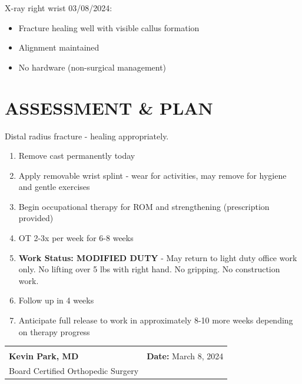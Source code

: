 \documentclass[11pt]{article}
\begin{document}
X-ray right wrist 03/08/2024:
\begin{itemize}[nosep]
\item Fracture healing well with visible callus formation
\item Alignment maintained
\item No hardware (non-surgical management)
\end{itemize}

\section*{ASSESSMENT \& PLAN}

Distal radius fracture - healing appropriately.

\begin{enumerate}
\item Remove cast permanently today
\item Apply removable wrist splint - wear for activities, may remove for hygiene and gentle exercises
\item Begin occupational therapy for ROM and strengthening (prescription provided)
\item OT 2-3x per week for 6-8 weeks
\item \textbf{Work Status: MODIFIED DUTY} - May return to light duty office work only. No lifting over 5 lbs with right hand. No gripping. No construction work.
\item Follow up in 4 weeks
\item Anticipate full release to work in approximately 8-10 more weeks depending on therapy progress
\end{enumerate}

\vspace{2em}

\begin{tabular}{@{}p{7cm}p{7cm}@{}}
\hrulefill & \\
\textbf{Kevin Park, MD} & \textbf{Date:} March 8, 2024 \\
Board Certified Orthopedic Surgery & \\
\end{tabular}
\end{document}
